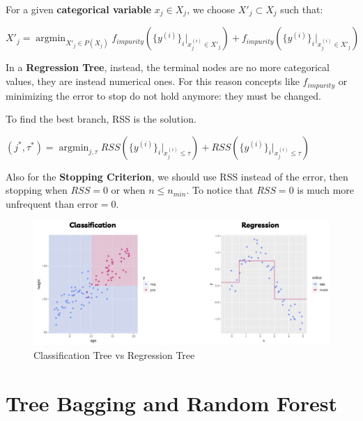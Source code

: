 For a given \textbf{categorical variable} $x_j \in X_j$, we choose $X'_j \subset X_j$ such that:

\begin{center}
    $X'_j = \operatorname*{argmin}_{X'_j \in P(X_j)} f_{impurity}(\{y^{(i)}\}_i |_{x^{(i)}_j \in X'_j}) + f_{impurity}(\{y^{(i)}\}_i |_{x^{(i)}_j \in X'_j})$
\end{center}

In a \textbf{Regression Tree}, instead, the terminal nodes are no more categorical values, they are instead numerical ones. For this reason concepts like $f_{impurity}$ or minimizing the error to stop do not hold anymore: they must be changed.

To find the best branch, RSS is the solution. 

\begin{center}
    $(j^*, \tau^*) = \operatorname*{argmin}_{j, \tau} RSS(\{y^{(i)}\}_i |_{x^{(i)}_j \leq \tau}) + RSS(\{y^{(i)}\}_i |_{x^{(i)}_j \leq \tau})$
\end{center}

Also for the \textbf{Stopping Criterion}, we should use RSS instead of the error, then stopping when $RSS=0$ or when $n \leq n_{min}$. To notice that $RSS=0$ is much more unfrequent than error$=0$.

\begin{center}
    \begin{figure}[H]
        \centering 
        \includegraphics[width=\textwidth]{assets/fig20.png}
        \caption{Classification Tree vs Regression Tree}
    \end{figure}
\end{center}

\newpage

\section{Tree Bagging and Random Forest}

